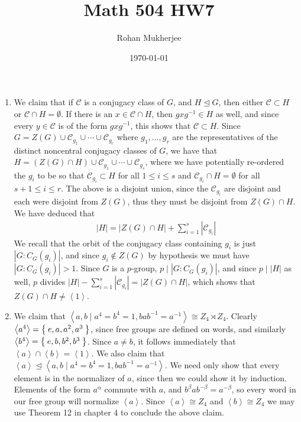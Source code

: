 \documentclass[12pt]{article}
\title{Math 504 HW7}
\date{\today}
\author{Rohan Mukherjee}
\theoremstyle{definitionstyle}
\newcommand{\gen}[1]{\left\langle #1 \right\rangle}
\newcommand{\nsg}{\trianglelefteq}
\begin{document}
	\maketitle
	\begin{enumerate}[leftmargin=\labelsep]
		\item We claim that if $\mathcal C$ is a conjugacy class of $G$, and $H \nsg G$, then either $\mathcal C \subset H$ or $\mathcal C \cap H = \emptyset$. If there is an $x \in \mathcal C \cap H$, then $gxg^{-1} \in H$ as well, and since every $y \in \mathcal C$ is of the form $gxg^{-1}$, this shows that $\mathcal C \subset H$. Since $G = Z(G) \cup \mathcal C_{g_1} \cup \cdots \cup \mathcal C_{g_r}$ where $g_1, \ldots, g_r$ are the representatives of the distinct noncentral conjugacy classes of $G$, we have that $H = (Z(G) \cap H) \cup \mathcal C_{g_1} \cup \cdots \cup \mathcal C_{g_s}$, where we have potentially re-ordered the $g_i$ to be so that $\mathcal C_{g_i} \subset H$ for all $1 \leq i \leq s$ and $\mathcal C_{g_i} \cap H = \emptyset$ for all $s+1 \leq i \leq r$. The above is a disjoint union, since the $\mathcal C_{g_i}$ are disjoint and each were disjoint from $Z(G)$, thus they must be disjoint from $Z(G) \cap H$. We have deduced that
		\begin{align*}
			|H| = |Z(G) \cap H| + \sum_{i=1}^s |\mathcal C_{g_i}|
		\end{align*}
		We recall that the orbit of the conjugacy class containing $g_i$ is just $|G : C_G(g_i)|$, and since $g_i \not \in Z(G)$ by hypothesis we must have $|G : C_G(g_i)| > 1$. Since $G$ is a $p$-group, $p \mid |G : C_G(g_i)|$, and since $p \mid |H|$ as well, $p$ divides $|H| - \sum_{i=1}^s |\mathcal C_{g_i}| = |Z(G) \cap H|$, which shows that $Z(G) \cap H \neq \gen{1}$.
		
		\item We claim that $\gen{a, b \mid a^4=b^4=1, bab^{-1}=a^{-1}} \cong Z_4 \rtimes Z_4$. Clearly $\gen{a^4} = \Set{e, a, a^2, a^3}$, since free groups are defined on words, and similarly $\gen{b^4} = \Set{e, b, b^2, b^3}$. Since $a \neq b$, it follows immediately that $\gen{a} \cap \gen{b} = \gen{1}$. We also claim that $\gen{a} \nsg \gen{a, b \mid a^4=b^4=1, bab^{-1}=a^{-1}}$. We need only show that every element is in the normalizer of $a$, since then we could show it by induction. Elements of the form $a^\alpha$ commute with $a$, and $b^\beta a b^{-\beta} = a^{-\beta}$, so every word in our free group will normalize $\gen{a}$. Since $\gen{a} \cong Z_4$ and $\gen{b} \cong Z_4$ we may use Theorem 12 in chapter 4 to conclude the above claim.
	\end{enumerate}
\end{document}
